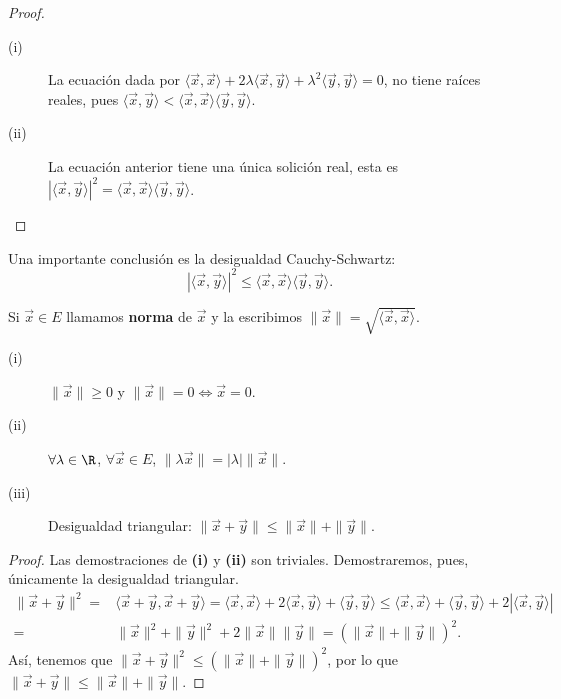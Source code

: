 \begin{proof}
\begin{description}
\item[(i)] La ecuación dada por $\displaystyle \langle \vec{x}, \vec{x} \rangle + 2\lambda \langle \vec{x}, \vec{y} \rangle + \lambda^{2} \langle \vec{y}, \vec{y} \rangle = 0 $, no tiene raíces reales, pues $\displaystyle \langle \vec{x}, \vec{y}\rangle < \langle \vec{x}, \vec{x} \rangle \langle \vec{y}, \vec{y} \rangle  $.
\item[(ii)] La ecuación anterior tiene una única solición real, esta es $\displaystyle \left|\langle \vec{x}, \vec{y} \rangle \right|^{2} = \langle \vec{x}, \vec{x} \rangle \langle \vec{y}, \vec{y} \rangle $.
\end{description}
\end{proof}
\begin{observation}
\normalfont Una importante conclusión es la desigualdad Cauchy-Schwartz:
\[ \left|\langle \vec{x}, \vec{y}\rangle \right|^{2} \leq \langle\vec{x},\vec{x}\rangle\langle\vec{y},\vec{y}\rangle .\]
\end{observation}
\begin{fdefinition}[Norma]
\normalfont Si $\displaystyle \vec{x} \in E $ llamamos \textbf{norma} de $\displaystyle \vec{x} $ y la escribimos $\displaystyle \| \vec{x} \| = \sqrt{\langle \vec{x}, \vec{x}\rangle } $.
\end{fdefinition}
\begin{fprop}[]
\normalfont 
\begin{description}
\item[(i)] $\displaystyle \|\vec{x}\| \geq 0 $ y $\displaystyle \| \vec{x} \| = 0 \iff \vec{x} = 0 $. 
\item[(ii)] $\displaystyle \forall \lambda \in \R $, $\displaystyle \forall \vec{x} \in E $, $\displaystyle \| \lambda \vec{x} \| = \left|\lambda \right| \| \vec{x} \| $.
\item[(iii)] Desigualdad triangular: $\displaystyle \| \vec{x} + \vec{y} \| \leq \| \vec{x} \| + \| \vec{y}\| $. 
\end{description}
\end{fprop}
\begin{proof}
Las demostraciones de \textbf{(i)} y \textbf{(ii)} son triviales. Demostraremos, pues, únicamente la desigualdad triangular. 
\[
\begin{split}
	\| \vec{x} + \vec{y}\|^{2} = & \langle \vec{x} + \vec{y}, \vec{x} +\vec{y} \rangle = \langle \vec{x}, \vec{x} \rangle + 2 \langle \vec{x}, \vec{y} \rangle + \langle \vec{y}, \vec{y} \rangle \leq \langle\vec{x}, \vec{x}\rangle + \langle \vec{y}, \vec{y} \rangle + 2 \left|\langle\vec{x}, \vec{y}\rangle \right| \\
	= & \|\vec{x}\|^{2} + \|\vec{y}\|^{2} +2\|\vec{x}\|\|\vec{y}\| = \left(\|\vec{x}\| + \|\vec{y}\|\right)^{2}.
\end{split}
\]
Así, tenemos que $\displaystyle \|\vec{x}+\vec{y}\|^{2} \leq \left(\|\vec{x}\| + \|\vec{y}\|\right)^{2} $, por lo que $\displaystyle \|\vec{x} + \vec{y}\| \leq \| \vec{x} \| + \|\vec{y}\| $.
\end{proof}
